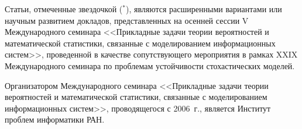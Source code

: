 {{{     Статьи, отмеченные звездочкой ($^*$), являются расширенными вариантами или 
научным развитием докладов, представленных на осенней сессии V Международного 
семинара <<Прикладные задачи теории вероятностей и математической статистики, 
связанные с моделированием информационных систем>>, проведенной в качестве 
сопутствующего мероприятия в рамках XXIX Международного семинара по проб\-ле\-мам 
устойчивости стохастических моделей. 

Организатором Международного семинара 
<<Прикладные задачи теории вероятностей и математической статистики, связанные с 
моделированием информационных систем>>, проводящегося с 2006~г., является Институт 
проблем информатики РАН.
     } }
     }